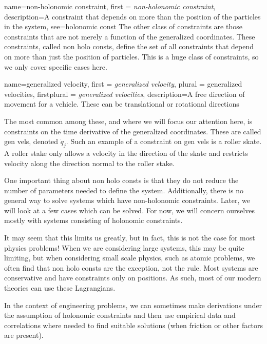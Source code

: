 {
    name=non-holonomic constraint,
    first = {\textit{non-holonomic constraint}},
    description={A constraint that depends on more than the position of the particles in the system},
    see={holonomic const}
}
The other class of constraints are those constraints that are not merely a function of the generalized coordinates. These constraints, called \glspl{non holo const}, define the set of all constraints that depend on more than just the position of particles. This is a huge class of constraints, so we only cover specific cases here.

{
    name=generalized velocity,
    first = {\textit{generalized velocity}},
    plural = {generalized velocities},
    firstplural = {\textit{generalized velocities}},
    description={A free direction of movement for a vehicle. These can be translational or rotational directions}
}

The most common among these, and where we will focus our attention here, is constraints on the time derivative of the generalized coordinates. These are called \glspl{gen vel}, denoted $\dot{q}_j$. Such an example of a constraint on \glspl{gen vel} is a roller skate. A roller stake only allows a velocity in the direction of the skate and restricts velocity along the direction normal to the roller stake.

One important thing about \glspl{non holo const} is that they do not reduce the number of parameters needed to define the system. Additionally, there is no general way to solve systems which have non-holonomic constraints. Later, we will look at a few cases which can be solved. For now, we will concern ourselves mostly with systems consisting of holonomic constraints.

It may seem that this limits us greatly, but in fact, this is not the case for most physics problems! When we are considering large systems, this may be quite limiting, but when considering small scale physics, such as atomic problems, we often find that \glspl{non holo const} are the exception, not the rule. Most systems are conservative and have constraints only on positions. As such, most of our modern theories can use these \glspl{Lagrangian}.

In the context of engineering problems, we can sometimes make derivations under the assumption of holonomic constraints and then use empirical data and correlations where needed to find suitable solutions (when friction or other factors are present).


